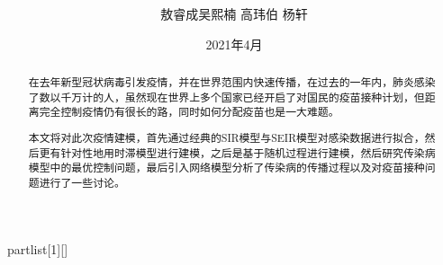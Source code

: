 \documentclass[UTF8]{ctexart}
\date{2021年4月}
\author{
	敖睿成\quad 吴熙楠 \quad 高玮伯 \quad 杨轩}
\title{
	\heiti{传染病模型与疫苗接种}
}
\begin{document}
	\maketitle
	\newtheorem{definition}{定义}[subsection]
	\newtheorem{function}{公式}[subsection]
	\newtheorem{summary}{小结}[subsection]
	\newtheorem{deduction}{推论}[subsection]
	\newtheorem{property}{性质}[subsection]
	\newtheorem{theo}{定理}[subsection]
	\newtheorem{step}{步骤}[subsection]
	\newtheorem{remark}{注记}[subsection]
	\newtheorem{proof}{证明}[subsection]
	\newenvironment{Theorem}[1][]{\par\noindent\textbf{定理}(#1)\quad}{\par}
	\newcommand{\rbra}[1]{\left( #1 \right)}
	\newcommand{\sbra}[1]{\left[ #1 \right]}
	\newcommand{\cbra}[1]{\left\{ #1 \right\}}
	\newcommand{\pbra}[1]{\left< #1 \right>}
	\newcommand{\abs}[1]{\left| #1 \right|}
	\newcommand{\fs}[2]{\displaystyle\frac{#1}{#2}}
	
	\newenvironment{myproof}{{\color{blue}证：}}
	
	\newenvironment{partlist}[1][]
	{\begin{enumerate}[itemsep=0pt, label=(\arabic*), wide, labelindent=\parindent, listparindent=\parindent, #1]}
		{\end{enumerate}}
	
	\renewcommand{\contentsname}{目录} %
	\tableofcontents
	\newpage
	\renewcommand{\abstractname}{\large 摘要\\}
	\begin{abstract}
    在去年新型冠状病毒引发疫情，并在世界范围内快速传播，在过去的一年内，肺炎感染了数以千万计的人，虽然现在世界上多个国家已经开启了对国民的疫苗接种计划，但距离完全控制疫情仍有很长的路，同时如何分配疫苗也是一大难题。
    
	本文将对此次疫情建模，首先通过经典的SIR模型与SEIR模型对感染数据进行拟合，然后更有针对性地用时滞模型进行建模，之后是基于随机过程进行建模，然后研究传染病模型中的最优控制问题，最后引入网络模型分析了传染病的传播过程以及对疫苗接种问题进行了一些讨论。

    \end{abstract}
\end{document}
